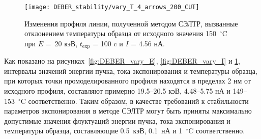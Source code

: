 \begin{figure}[h!]
	\begin{center}
		\texttt{[image: DEBER\_stability/vary\_T\_4\_arrows\_200\_CUT]}
	\end{center}
	\vspace{-0.5em}
	\caption{Изменения профиля линии, полученной методом СЭЛТР, вызванные отклонением температуры образца от исходного значения 150~$^\circ$C при $E$ =~20 кэВ, $t_\mathrm{exp}$ = 100 c и $I$ = 4.56 нА.}
	\label{fig:DEBER_vary_T}
	\vspace{0.5em}
\end{figure}

Как показано на рисунках~\ref{fig:DEBER_vary_E}, \ref{fig:DEBER_vary_I} и \ref{fig:DEBER_vary_T}, интервалы значений энергии пучка, тока экспонирования и температуры образца, при которых точки промоделированного профиля находятся в пределах 2 нм от исходного профиля, составляют примерно 19.5--20.5 кэВ, 4.48--5.75 нА и 149--153~$^\circ$C соответственно. Таким образом, в качестве требований к стабильности параметров экспонирования в методе СЭЛТР могут быть приняты максимально допустимые значения флуктуаций энергии пучка, тока экспонирования и температуры образца, составляющие 0.5~кэВ, 0.1~нА и 1~$^\circ$C соответственно.
